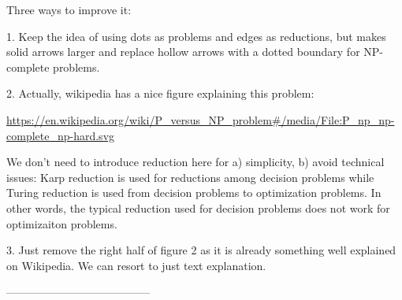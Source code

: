 Three ways to improve it:

1. Keep the idea of using dots as problems and edges as reductions, but makes solid arrows larger and replace hollow arrows with a dotted boundary for NP-complete problems.

2. Actually, wikipedia has a nice figure explaining this problem:
\par
\url{https://en.wikipedia.org/wiki/P_versus_NP_problem#/media/File:P_np_np-complete_np-hard.svg}
\par
We don't need to introduce reduction here for a) simplicity, b) avoid technical issues:
Karp reduction is used for reductions among decision problems while Turing reduction is used from decision problems to optimization problems. In other words, the typical reduction used for decision problems does not work for optimizaiton problems.

3. Just remove the right half of figure 2 as it is already something well explained on Wikipedia. We can resort to just text explanation.

---------------------------------------





